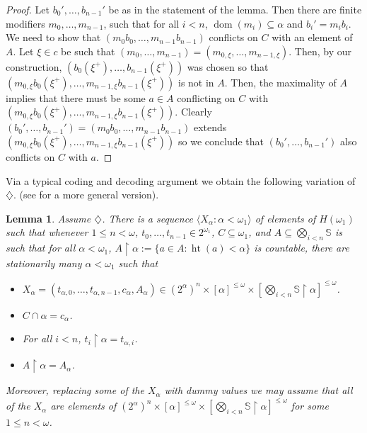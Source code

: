 \documentclass[10pt,a4paper]{amsart}
\newtheorem{lemma}[theorem]{Lemma}
\theoremstyle{definition}
\newcommand{\seb}{\subseteq}
\newcommand{\res}{\!\upharpoonright\!}
\newcommand{\tup}[1]{\langle#1\rangle}
\newcommand{\1}{\mathbf{1}}
\newcommand{\dia}{\diamondsuit}
\renewcommand{\S}{\mathbb{S}}
\DeclareMathOperator{\dom}{dom}
\DeclareMathOperator{\hht}{ht}
\begin{document}
\begin{proof}
  Let $b_{0}',\dots,b_{n-1}'$ be
  as in the statement of the lemma. Then there are finite modifiers
  $m_{0},\dots,m_{n-1}$, such that for all $i < n$, $\dom(m_{i}) \seb \alpha$
  and $b_{i}' = m_{i} b_{i}$. We need to show
  that $(m_{0}b_{0},\dots,m_{n-1}b_{n-1})$ conflicts on $C$
  with an element of $A$.
  Let $\xi \in c$ be such that
  $(m_{0},\dots,m_{n-1}) = (m_{0,\xi},\dots,m_{n-1,\xi})$. Then, by our construction,
  $(b_{0}(\xi^{+}),\dots,b_{n-1}(\xi^{+}))$ was chosen so that
  $(m_{0,\xi}b_{0}(\xi^{+}),\dots,\allowbreak m_{n-1,\xi}b_{n-1}(\xi^{+}))$ is
  not in $A$. Then, the maximality of $A$ implies that there must be
  some $a \in A$ conflicting on $C$ with
  $(m_{0,\xi}b_{0}(\xi^{+}),\dots,\allowbreak m_{n-1,\xi}b_{n-1}(\xi^{+}))$. Clearly
  $(b_{0}',\dots,b_{n-1}') = (m_{0}b_{0},\dots,m_{n-1}b_{n-1})$ extends
  $(m_{0,\xi}b_{0}(\xi^{+}),\dots,\allowbreak m_{n-1,\xi}b_{n-1}(\xi^{+}))$
  so we conclude that
  $(b_{0}',\dots,b_{n-1}')$ also conflicts on $C$ with $a$.
\end{proof}


Via a typical coding and decoding argument we obtain the following
variation of $\dia$. (see \cite{BrodskyRinotI} for a more general version).

\begin{lemma}\label{lem:diamond}
  Assume $\dia$. There
  is a sequence $\tup{X_{\alpha} : \alpha < \omega_{1}}$ of
  elements of $H(\omega_{1})$ such that
  whenever $1 \le n < \omega$, $t_{0},\dots,t_{n-1} \in 2^{\omega_{1}}$,
  $C \seb \omega_{1}$, and
  $A \seb \bigotimes_{i < n}\S$ is such that for all $\alpha < \omega_{1}$,
  $A\res \alpha := \{a \in A : \hht(a) < \alpha\}$ is countable,
  there are stationarily many $\alpha < \omega_{1}$ such that
  \begin{itemize}
    \item $X_{\alpha} = (t_{\alpha,0},\dots,t_{\alpha,n-1},c_{\alpha},A_{\alpha})
    \in (2^{\alpha})^{n}\times [\alpha]^{\le\omega}\times
    [\bigotimes_{i <n} \S\res \alpha]^{\le \omega}$.
    \item $C \cap \alpha = c_{\alpha}$.
    \item For all $i < n$, $t_{i}\res \alpha = t_{\alpha,i}$.
    \item $A \res \alpha = A_{\alpha}$.
  \end{itemize}
  Moreover, replacing some of the $X_{\alpha}$ with dummy values
  we  may assume that all of the $X_{\alpha}$ are
  elements of $(2^{\alpha})^{n}\times [\alpha]^{\le\omega}\times
    [\bigotimes_{i <n} \S\res \alpha]^{\le\omega}$
  for some $1 \le n < \omega$.
\end{lemma}
\end{document}
